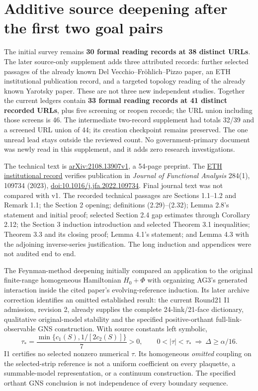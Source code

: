\section{Additive source deepening after the first two goal pairs}
\label{r28:app:source-supplement}
The initial survey remains \textbf{30 formal reading records at 38 distinct URLs}. The later source-only supplement adds three attributed records: further selected passages of the already known Del Vecchio--Fr\"ohlich--Pizzo paper, an ETH institutional publication record, and a targeted topology reading of the already known Yarotsky paper. These are not three new independent studies. Together the current ledgers contain \textbf{33 formal reading records at 41 distinct recorded URLs}, plus five screening or reopen records; the URL union including those screens is 46. The intermediate two-record supplement had totals 32/39 and a screened URL union of 44; its creation checkpoint remains preserved. The one unread lead stays outside the reviewed count. No government-primary document was newly read in this supplement, and it adds zero research investigations.

The technical text is \href{https://arxiv.org/abs/2108.13907}{arXiv:2108.13907v1}, a 54-page preprint. The \href{https://www.research-collection.ethz.ch/items/142ea4e3-1538-4f05-8a97-5200a860d558}{ETH institutional record} verifies publication in \emph{Journal of Functional Analysis} 284(1), 109734 (2023), \href{https://doi.org/10.1016/j.jfa.2022.109734}{doi:10.1016/j.jfa.2022.109734}. Final journal text was not compared with v1. The recorded technical passages are Sections 1.1--1.2 and Remark 1.1; the Section 2 opening; definitions (2.29)--(2.32); Lemma 2.8's statement and initial proof; selected Section 2.4 gap estimates through Corollary 2.12; the Section 3 induction introduction and selected Theorem 3.1 inequalities; Theorem 3.3 and its closing proof; Lemma 4.1's statement; and Lemma 4.3 with the adjoining inverse-series justification. The long induction and appendices were not audited end to end.

The Feynman-method deepening initially compared an application to the original finite-range homogeneous Hamiltonian $H_0+\Phi$ with organizing AG3's generated interaction inside the cited paper's evolving-reference induction. Its later archive correction identifies an omitted established result: the current Round21 I1 admission, revision 2, already supplies the complete 24-link/21-face dictionary, qualitative original-model stability and the specified positive-orthant full-link-observable GNS construction. With source constants left symbolic,
\begin{equation}
 \tau_* =\frac{\min\{c_1(S),1/[2c_2(S)]\}}7>0,\qquad
 0<|\tau|<\tau_*\ \Longrightarrow\ \Delta\ge\alpha/16.
\end{equation}
I1 certifies no selected nonzero numerical $\tau$. Its homogeneous \emph{omitted} coupling on the selected-strip reference is not a uniform coefficient on every plaquette, a summable-model representation, or a continuum construction. The specified orthant GNS conclusion is not independence of every boundary sequence.

